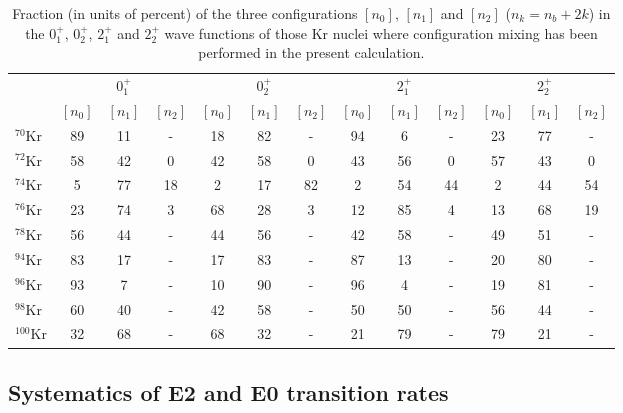 \documentclass[twocolumn,showpacs,amsmath,amssymb,superscriptaddress]{revtex4-1}
\begin{document}
\begin{table}[htb]
\caption{\label{tab:frac} Fraction (in units of percent) of the three configurations 
 $[n_0]$, $[n_1]$ and $[n_2]$ ($n_k=n_b+2k$) in the $0^+_1$,
 $0^+_2$, $2^+_1$ and $2^+_2$ wave functions of those Kr nuclei where
 configuration mixing has been performed in the present calculation. 
}
\begin{center}
\begin{tabular}{lcccccccccccc}
\hline\hline
\multirow{2}{*}{} 
& \multicolumn{3}{c}{$0^+_1$} & \multicolumn{3}{c}{$0^+_2$} &
 \multicolumn{3}{c}{$2^+_1$} & \multicolumn{3}{c}{$2^+_2$} \\
\cline{2-4}
\cline{5-7}
\cline{8-10}
\cline{11-13}
 & $[n_0]$ & $[n_1]$ & $[n_2]$ & $[n_0]$ & $[n_1]$ & $[n_2]$ & $[n_0]$ &
 $[n_1]$ & $[n_2]$ & $[n_0]$ & $[n_1]$ & $[n_2]$ \\
\hline
$^{70}$Kr & 89 & 11 & - & 18 & 82 & - & 94 & 6 & - & 23 & 77 & - \\
$^{72}$Kr & 58 & 42 & 0 & 42 & 58 & 0 & 43 & 56 & 0 & 57 & 43 & 0 \\
$^{74}$Kr & 5 & 77 & 18 & 2 & 17 & 82 & 2 & 54 & 44 & 2 & 44 & 54 \\
$^{76}$Kr & 23 & 74 & 3 & 68 & 28 & 3 & 12 & 85 & 4 & 13 & 68 & 19 \\
$^{78}$Kr & 56 & 44 & - & 44 & 56 & - & 42 & 58 & - & 49 & 51 & - \\
$^{94}$Kr & 83 & 17 & - & 17 & 83 & - & 87 & 13 & - & 20 & 80 & - \\
$^{96}$Kr & 93 & 7 & - & 10 & 90 & - & 96 & 4 & - & 19 & 81 & - \\
$^{98}$Kr & 60 & 40 & - & 42 & 58 & - & 50 & 50 & - & 56 & 44 & - \\
$^{100}$Kr & 32 & 68 & - & 68 & 32 & - & 21 & 79 & - & 79 & 21 & - \\
\hline\hline
\end{tabular}
\end{center}
\end{table}




\subsection{Systematics of E2 and E0 transition rates\label{sec:transition}}
\end{document}
